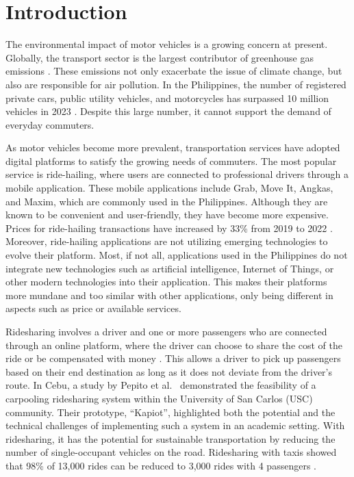 \chapter{Introduction}

The environmental impact of motor vehicles is a growing concern at present. Globally, the transport sector is the largest contributor of greenhouse gas emissions \cite{whoHealthRisks}. These emissions not only exacerbate the issue of climate change, but also are responsible for air pollution. In the Philippines, the number of registered private cars, public utility vehicles, and motorcycles has surpassed 10 million vehicles in 2023 \cite{statistaPhilippinesNumber,statistaPhilippinesTotal,statistaPhilippinesNumber2}. Despite this large number, it cannot support the demand of everyday commuters. 

As motor vehicles become more prevalent, transportation services have adopted digital platforms to satisfy the growing needs of commuters. The most popular service is ride-hailing, where users are connected to professional drivers through a mobile application. These mobile applications include Grab, Move It, Angkas, and Maxim, which are commonly used in the Philippines. Although they are known to be convenient and user-friendly, they have become more expensive. Prices for ride-hailing transactions have increased by 33\% from 2019 to 2022 \cite{bainEConomy2022}. Moreover, ride-hailing applications are not utilizing emerging technologies to evolve their platform. Most, if not all, applications used in the Philippines do not integrate new technologies such as artificial intelligence, Internet of Things, or other modern technologies into their application. This makes their platforms more mundane and too similar with other applications, only being different in aspects such as price or available services.

Ridesharing involves a driver and one or more passengers who are connected through an online platform, where the driver can choose to share the cost of the ride or be compensated with money \cite{mitropoulos2021systematic}. This allows a driver to pick up passengers based on their end destination as long as it does not deviate from the driver's route. In Cebu, a study by Pepito et al.~\cite{pepito2022} demonstrated the feasibility of a carpooling ridesharing system within the University of San Carlos (USC) community. Their prototype, “Kapiot”, highlighted both the potential and the technical challenges of implementing such a system in an academic setting. With ridesharing, it has the potential for sustainable transportation by reducing the number of single-occupant vehicles on the road. Ridesharing with taxis showed that 98\% of 13,000 rides can be reduced to 3,000 rides with 4 passengers \cite{alonso2017demand}.

